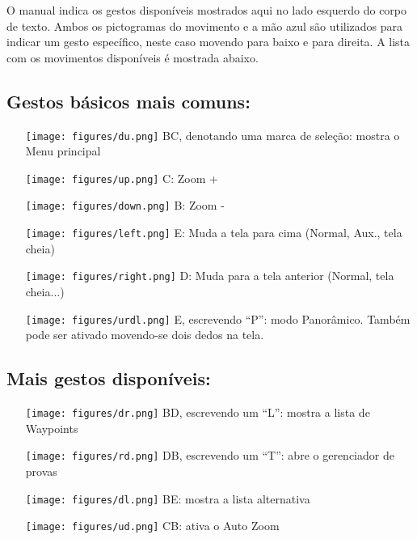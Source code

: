 O manual indica os gestos disponíveis mostrados aqui no lado esquerdo do corpo de texto.  Ambos os pictogramas do movimento e a mão azul são utilizados para indicar um gesto específico, neste caso movendo para baixo e para direita.  A lista com os movimentos disponíveis é mostrada abaixo. 
\vspace{2em}

\subsection*{Gestos básicos mais comuns:}
\begin{itemize}
\item[\raisebox{-1em}
{\texttt{[image: figures/du.png]}}] BC, denotando uma marca de seleção: mostra o Menu principal
\item[\raisebox{-1em}
{\texttt{[image: figures/up.png]}}] C: Zoom +
\item[\raisebox{-1em}
{\texttt{[image: figures/down.png]}}] B: Zoom -
\item[\raisebox{-1em}
{\texttt{[image: figures/left.png]}}] E: Muda a tela para cima (Normal, Aux., tela cheia)
\item[\raisebox{-1em}
{\texttt{[image: figures/right.png]}}] D: Muda para a tela anterior (Normal, tela cheia...)
\item[\raisebox{-1em}
{\texttt{[image: figures/urdl.png]}}] E, escrevendo “P”: modo Panorâmico.  Também pode ser ativado movendo-se dois dedos na tela.
\end{itemize}
\vspace{2em}

\subsection*{Mais gestos disponíveis:}
\begin{itemize}
\item[\raisebox{-1em}
{\texttt{[image: figures/dr.png]}}] BD, escrevendo um “L”: mostra a lista de Waypoints 
\item[\raisebox{-1em}
{\texttt{[image: figures/rd.png]}}] DB, escrevendo um “T”: abre o gerenciador de provas
\item[\raisebox{-1em}
{\texttt{[image: figures/dl.png]}}] BE: mostra a lista alternativa
\item[\raisebox{-1em}
{\texttt{[image: figures/ud.png]}}]CB: ativa o Auto Zoom
\end{itemize}
\vspace{2em}

